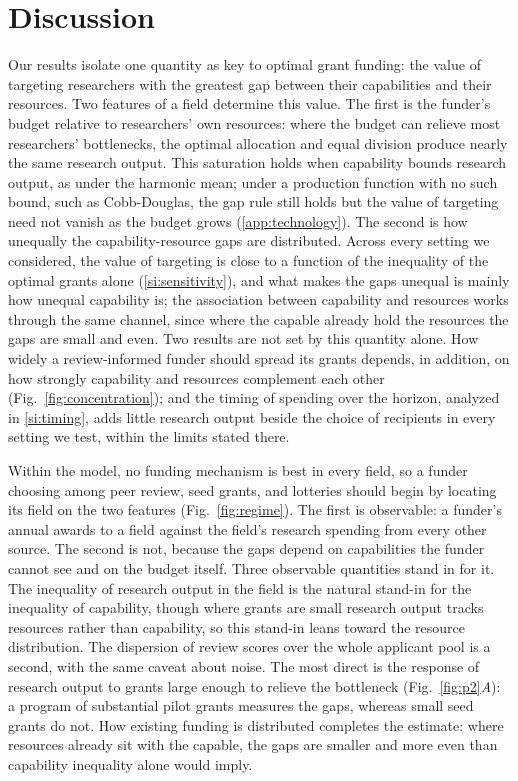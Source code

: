 \documentclass[article, 11pt, reqno]{amsart}
\theoremstyle{named}
\begin{document}
\section*{Discussion}
Our results isolate one quantity as key to optimal grant funding: the value of targeting researchers with the greatest gap between their capabilities and their resources. Two features of a field determine this value. The first is the funder's budget relative to researchers' own resources: where the budget can relieve most researchers' bottlenecks, the optimal allocation and equal division produce nearly the same research output. This saturation holds when capability bounds research output, as under the harmonic mean; under a production function with no such bound, such as Cobb-Douglas, the gap rule still holds but the value of targeting need not vanish as the budget grows (\ref{app:technology}). The second is how unequally the capability-resource gaps are distributed. Across every setting we considered, the value of targeting is close to a function of the inequality of the optimal grants alone (\ref{si:sensitivity}), and what makes the gaps unequal is mainly how unequal capability is; the association between capability and resources works through the same channel, since where the capable already hold the resources the gaps are small and even. Two results are not set by this quantity alone. How widely a review-informed funder should spread its grants depends, in addition, on how strongly capability and resources complement each other (Fig.~\ref{fig:concentration}); and the timing of spending over the horizon, analyzed in \ref{si:timing}, adds little research output beside the choice of recipients in every setting we test, within the limits stated there.

Within the model, no funding mechanism is best in every field, so a funder choosing among peer review, seed grants, and lotteries should begin by locating its field on the two features (Fig.~\ref{fig:regime}). The first is observable: a funder's annual awards to a field against the field's research spending from every other source. The second is not, because the gaps depend on capabilities the funder cannot see and on the budget itself. Three observable quantities stand in for it. The inequality of research output in the field is the natural stand-in for the inequality of capability, though where grants are small research output tracks resources rather than capability, so this stand-in leans toward the resource distribution. The dispersion of review scores over the whole applicant pool is a second, with the same caveat about noise. The most direct is the response of research output to grants large enough to relieve the bottleneck (Fig.~\ref{fig:p2}\textit{A}): a program of substantial pilot grants measures the gaps, whereas small seed grants do not. How existing funding is distributed completes the estimate: where resources already sit with the capable, the gaps are smaller and more even than capability inequality alone would imply.
\end{document}

